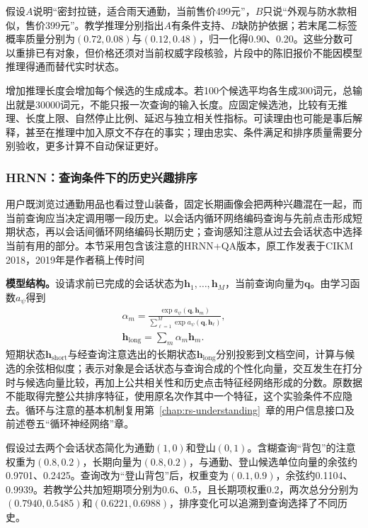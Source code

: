 假设$A$说明“密封拉链，适合雨天通勤，当前售价499元”，$B$只说“外观与防水款相似，售价399元”。教学推理分别指出$A$有条件支持、$B$缺防护依据；若末尾二标签概率质量分别为$(0.72,0.08)$与$(0.12,0.48)$，归一化得0.90、0.20。这些分数可以重排已有对象，但价格还须对当前权威字段核验，片段中的陈旧报价不能因模型推理得通而替代实时状态。

增加推理长度会增加每个候选的生成成本。若100个候选平均各生成300词元，总输出就是30000词元，不能只报一次查询的输入长度。应固定候选池，比较有无推理、长度上限、自然停止比例、延迟与独立相关性指标。可读理由也可能是事后解释，甚至在推理中加入原文不存在的事实；理由忠实、条件满足和排序质量需要分别验收，更多计算不自动保证更好。

\Needspace{100mm}
\subsubsection{HRNN：查询条件下的历史兴趣排序}
\label{sec:rs-search-hrnn}

用户既浏览过通勤用品也看过登山装备，固定长期画像会把两种兴趣混在一起，而当前查询应当决定调用哪一段历史。以会话内循环网络编码查询与先前点击形成短期状态，再以会话间循环网络编码长期历史；查询感知注意从过去会话状态中选择当前有用的部分。本节采用包含该注意的HRNN+QA版本，原工作发表于CIKM 2018，2019年是作者稿上传时间

\textbf{模型结构。}设请求前已完成的会话状态为$\bm h_1,\ldots,\bm h_M$，当前查询向量为$\bm q$。由学习函数$a_\psi$得到
\begin{equation}
 \begin{split}
 \alpha_m=\frac{\exp a_\psi(\bm q,\bm h_m)}
 {\sum_{\ell=1}^{M}\exp a_\psi(\bm q,\bm h_\ell)},\qquad\\
 \bm h_{\mathrm{long}}=\sum_m\alpha_m\bm h_m .
 \end{split}
 \label{eq:rs-search-hrnn}
\end{equation}
短期状态$\bm h_{\mathrm{short}}$与经查询注意选出的长期状态$\bm h_{\mathrm{long}}$分别投影到文档空间，计算与候选的余弦相似度；表示对象是会话状态与查询合成的个性化向量，交互发生在打分时与候选向量比较，再加上公共相关性和历史点击特征经网络形成的分数。原数据不能取得完整公共排序特征，使用原名次作其中一个特征，这个实验条件不应隐去。循环与注意的基本机制复用第~\ref{chap:rs-understanding}~章的用户信息接口及前述卷五“循环神经网络”章。

假设过去两个会话状态简化为通勤$(1,0)$和登山$(0,1)$。含糊查询“背包”的注意权重为$(0.8,0.2)$，长期向量为$(0.8,0.2)$，与通勤、登山候选单位向量的余弦约0.9701、0.2425。查询改为“登山背包”后，权重变为$(0.1,0.9)$，余弦约0.1104、0.9939。若教学公共加短期项分别为0.6、0.5，且长期项权重0.2，两次总分分别为$(0.7940,0.5485)$和$(0.6221,0.6988)$，排序变化可以追溯到查询选择了不同历史。

